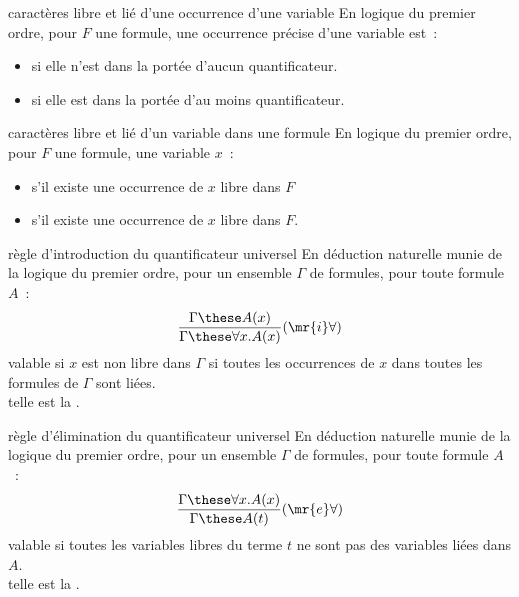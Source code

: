 \begin{definition}{7.24}{caractères libre et lié d'une occurrence d'une variable}
    En logique du premier ordre, pour $F$ une formule, une occurrence précise d'une variable est~:
    \begin{itemize}
        \item {} si elle n'est dans la portée d'aucun quantificateur.
        \item {} si elle est dans la portée d'au moins quantificateur.
    \end{itemize}
\end{definition}

\begin{definition}{7.25}{caractères libre et lié d'un variable dans une formule}
    En logique du premier ordre, pour $F$ une formule, une variable $x$~:
    \begin{itemize}
        \item {} s'il existe une occurrence de $x$ libre dans $F$
        \item {} s'il existe une occurrence de $x$ libre dans $F$.
    \end{itemize}
\end{definition}


\begin{definition}{7.26}{règle d'introduction du quantificateur universel}
    En déduction naturelle munie de la logique du premier ordre, pour un ensemble $\Gamma$ de formules, pour toute formule $A$~:
    $$\frac{\Gamma \these A(x)}{\Gamma \these \forall x.A(x)}(\mr{i}\forall)$$
    valable si $x$ est non libre dans $\Gamma$ \ie si toutes les occurrences de $x$ dans toutes les formules de $\Gamma$ sont liées.\\
    telle est la .
\end{definition}

\begin{definition}{7.27}{règle d'élimination du quantificateur universel}
    En déduction naturelle munie de la logique du premier ordre, pour un ensemble $\Gamma$ de formules, pour toute formule $A$~:
    $$\frac{\Gamma \these \forall x.A(x)}{\Gamma \these A(t)}(\mr{e}\forall)$$
    valable si toutes les variables libres du terme $t$ ne sont pas des variables liées dans $A$.\\
    telle est la .
\end{definition}


